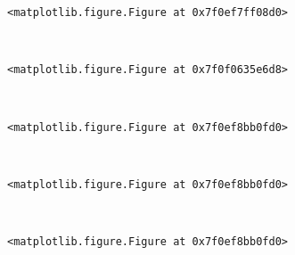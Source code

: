 \documentclass[11pt]{article}
\begin{document}
    
    \begin{verbatim}
<matplotlib.figure.Figure at 0x7f0ef7ff08d0>
    \end{verbatim}

    
    \begin{center}
    \end{center}
    { \hspace*{\fill} \\}
    
    
    \begin{verbatim}
<matplotlib.figure.Figure at 0x7f0f0635e6d8>
    \end{verbatim}

    
    \begin{center}
    \end{center}
    { \hspace*{\fill} \\}
    
    
    \begin{verbatim}
<matplotlib.figure.Figure at 0x7f0ef8bb0fd0>
    \end{verbatim}

    
    \begin{center}
    \end{center}
    { \hspace*{\fill} \\}
    
    
    \begin{verbatim}
<matplotlib.figure.Figure at 0x7f0ef8bb0fd0>
    \end{verbatim}

    
    \begin{center}
    \end{center}
    { \hspace*{\fill} \\}
    
    
    \begin{verbatim}
<matplotlib.figure.Figure at 0x7f0ef8bb0fd0>
    \end{verbatim}

    
    \begin{center}
    \end{center}
    { \hspace*{\fill} \\}
    
\end{document}
